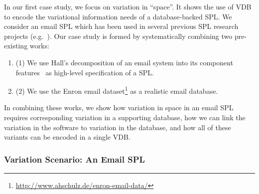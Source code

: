 In our first case study, we focus on variation in ``space''.
It shows the use of VDB to encode the variational
information needs of a database-backed SPL. We consider an email
SPL which has been used in several previous SPL research projects (e.g.\
\cite{Apel13:SSP,AlHaj19}).
%
%
Our case study is formed by systematically combining two pre-existing works:
%
\begin{enumerate}
%
\item 
(1) We use Hall's decomposition of an email system into its component
features~\cite{Hall05} as high-level specification of a SPL.
%
\item 
(2) We use the Enron email
dataset\footnote{\url{http://www.ahschulz.de/enron-email-data/}} as 
a realistic email database.
%
\end{enumerate}
%
In combining these works, we show how variation in space in an email SPL
requires corresponding variation in a supporting database, how we can link the
variation in the software to variation in the database, and how all of these
variants can be encoded in a single VDB.


\subsubsection{Variation Scenario: An Email SPL}
\label{sec:enron-scenario}


